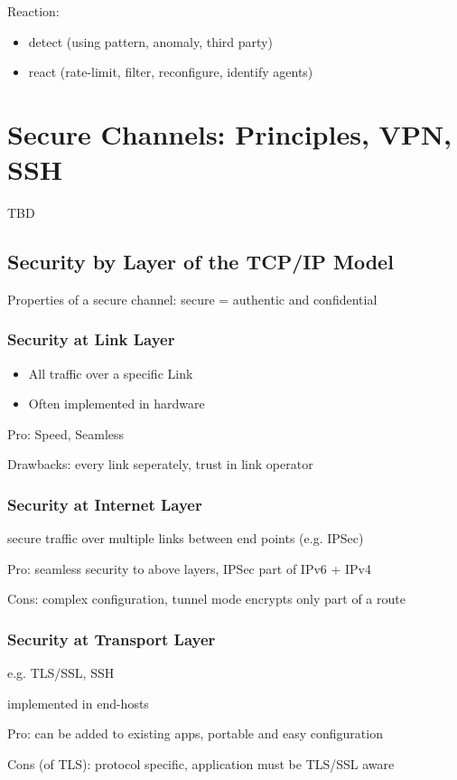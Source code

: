 \documentclass[fs, footer]{latex4ei}
\begin{document}
\begin{multicols*}{4}
Reaction:
\begin{itemize}
	\item detect (using pattern, anomaly, third party)
	\item react (rate-limit, filter, reconfigure, identify agents)
\end{itemize}

\section{Secure Channels: Principles, VPN, SSH}
TBD
\subsection{Security by Layer of the TCP/IP Model}
Properties of a secure channel: secure = authentic and confidential

\subsubsection{Security at Link Layer}
\begin{itemize}
	\item All traffic over a specific Link
	\item Often implemented in hardware
\end{itemize}

Pro: Speed, Seamless

Drawbacks: every link seperately, trust in link operator

\subsubsection{Security at Internet Layer}
secure traffic over multiple links between end points (e.g. IPSec)

Pro: seamless security to above layers, IPSec part of IPv6 + IPv4

Cons: complex configuration, tunnel mode encrypts only part of a route


\subsubsection{Security at Transport Layer}
e.g. TLS/SSL, SSH

implemented in end-hosts

Pro: can be added to existing apps, portable and easy configuration

Cons (of TLS): protocol specific, application must be TLS/SSL aware



\end{multicols*}
\end{document}
